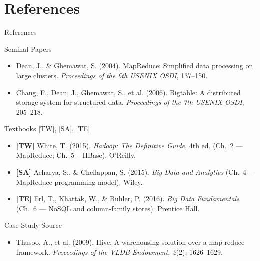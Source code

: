 \documentclass[aspectratio=169,10pt]{beamer}
\begin{document}
\section*{References}

\begin{frame}{References}
  \begin{block}{Seminal Papers}
    \begin{itemize}
      \item Dean, J., \& Ghemawat, S. (2004).
            MapReduce: Simplified data processing on large clusters.
            \textit{Proceedings of the 6th USENIX OSDI}, 137--150.
      \item Chang, F., Dean, J., Ghemawat, S., et al. (2006).
            Bigtable: A distributed storage system for structured data.
            \textit{Proceedings of the 7th USENIX OSDI}, 205--218.
    \end{itemize}
  \end{block}
  \vspace{4pt}
  \begin{block}{Textbooks \textmd{[TW], [SA], [TE]}}
    \begin{itemize}
      \item \textbf{[TW]} White, T. (2015).
            \textit{Hadoop: The Definitive Guide}, 4th ed.
            (Ch.~2 — MapReduce; Ch.~5 -- HBase). O'Reilly.
      \item \textbf{[SA]} Acharya, S., \& Chellappan, S. (2015).
            \textit{Big Data and Analytics}
            (Ch.~4 — MapReduce programming model). Wiley.
      \item \textbf{[TE]} Erl, T., Khattak, W., \& Buhler, P. (2016).
            \textit{Big Data Fundamentals}
            (Ch.~6 — NoSQL and column-family stores). Prentice Hall.
    \end{itemize}
  \end{block}
  \vspace{4pt}
  \begin{block}{Case Study Source}
    \begin{itemize}
      \item Thusoo, A., et al. (2009).
            Hive: A warehousing solution over a map-reduce framework.
            \textit{Proceedings of the VLDB Endowment, 2}(2), 1626--1629.
    \end{itemize}
  \end{block}
\end{frame}
\end{document}
